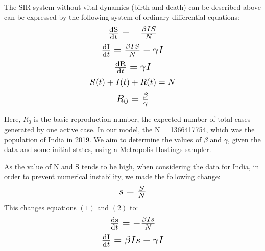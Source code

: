 \documentclass[letterpaper,12pt]{report}
\begin{document}
\noindent
The SIR system without vital dynamics (birth and death) can be described above can be expressed by the following system of ordinary differential equations: \\
\begin{equation}
    \scalebox{1.4}{$\frac{\mathrm{dS} }{\mathrm{d} t} = -\frac{\beta IS}{N}$}
\end{equation}
\begin{equation}
    \scalebox{1.4}{$\frac{\mathrm{dI} }{\mathrm{d} t} = \frac{\beta IS}{N} - \gamma I$}
\end{equation}
\begin{equation}
    \scalebox{1.4}{$\frac{\mathrm{dR} }{\mathrm{d} t} = \gamma I$}
\end{equation}
\begin{equation}
    \scalebox{1.2}{$S(t) + I(t) + R(t) = N$}
\end{equation}
\begin{equation}
    \scalebox{1.4}{$R_0 = \frac{\beta }{\gamma }$}
\end{equation}


\noindent
Here, $R_0$ is the basic reproduction number, the expected number of total cases generated by one active case. In our model, the N = 1366417754, which was the population of India in 2019. We aim to determine the values of $\beta$ and $\gamma$, given the data and some initial states, using a Metropolis Hastings sampler.\\ \vspace{-10pt}

\noindent
As the value of N and S tends to be high, when considering the data for India, in order to prevent numerical instability, we made the following change: \vspace{-5pt}
\begin{equation*}
    \scalebox{1.4}{$s = \frac{S}{N}$}    
\end{equation*} \vspace{-5pt}
This changes equations $(1)$ and $(2)$ to: \vspace{-5pt}
\begin{equation}
    \scalebox{1.4}{$\frac{\mathrm{ds} }{\mathrm{d} t} = -\frac{\beta Is}{N}$}
\end{equation}
\begin{equation}
    \scalebox{1.4}{$\frac{\mathrm{dI} }{\mathrm{d} t} = \beta Is - \gamma I$}
\end{equation} \vspace{-20pt}
\end{document}
